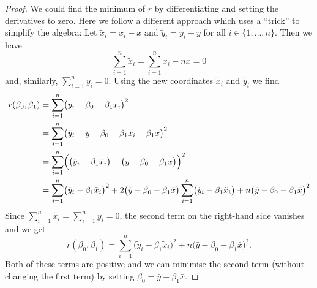 \documentclass[
  a4paper,
]{article}
\theoremstyle{definition}
\theoremstyle{definition}
\theoremstyle{definition}
\theoremstyle{definition}
\theoremstyle{remark}
\begin{document}
\begin{proof}
We could find the minimum of \(r\) by differentiating and setting the
derivatives to zero. Here we follow a different approach which uses
a ``trick'' to simplify the algebra: Let \(\tilde x_i = x_i - \bar x\)
and \(\tilde y_i = y_i - \bar y\) for all \(i \in \{1, \ldots, n\}\).
Then we have
\begin{equation*}
    \sum_{i=1}^n \tilde x_i
    = \sum_{i=1}^n x_i - n \bar x
    = 0
  \end{equation*}
and, similarly, \(\sum_{i=1}^n \tilde y_i = 0\). Using the new
coordinates \(\tilde x_i\) and \(\tilde y_i\) we find
\begin{align*}
    r(\beta_0, \beta_1)
    &= \sum_{i=1}^n \bigl(y_i - \beta_0 - \beta_1 x_i \bigr)^2 \\
    &= \sum_{i=1}^n \bigl( \tilde y_i + \bar y - \beta_0 - \beta_1 \tilde x_i - \beta_1 \bar x \bigr)^2 \\
    &= \sum_{i=1}^n \Bigl( \bigl( \tilde y_i - \beta_1 \tilde x_i \bigr)
    + \bigl( \bar y - \beta_0 - \beta_1 \bar x \bigr) \Bigr)^2 \\
    &= \sum_{i=1}^n \bigl( \tilde y_i - \beta_1 \tilde x_i \bigr)^2
    + 2 \bigl( \bar y - \beta_0 - \beta_1 \bar x \bigr) \sum_{i=1}^n \bigl( \tilde y_i - \beta_1 \tilde x_i \bigr)
    + n \bigl( \bar y - \beta_0 - \beta_1 \bar x \bigr)^2
  \end{align*}
Since \(\sum_{i=1}^n \tilde x_i = \sum_{i=1}^n \tilde y_i = 0\), the
second term on the right-hand side vanishes and we get
\begin{equation}
    r(\beta_0, \beta_1)
    = \sum_{i=1}^n \bigl( \tilde y_i - \beta_1 \tilde x_i \bigr)^2
    + n \bigl( \bar y - \beta_0 - \beta_1 \bar x \bigr)^2.  \label{eq:RSS-rewrite}
  \end{equation}
Both of these terms are positive and we can minimise the second term
(without changing the first term) by setting
\(\beta_0 = \bar y - \beta_1 \bar x\).


\end{proof}
\end{document}
